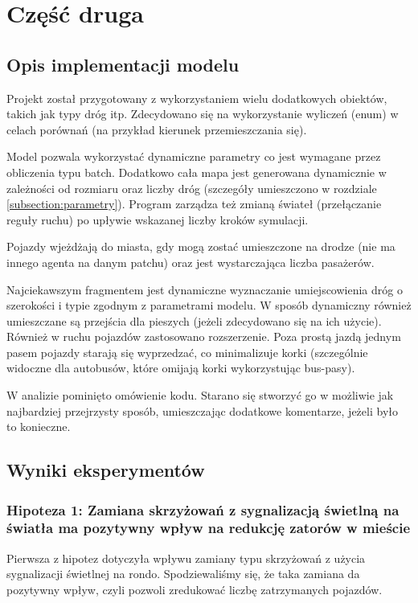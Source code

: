 \documentclass{article}
\begin{document}
\section{Część druga}
\subsection{Opis implementacji modelu}
Projekt został przygotowany z wykorzystaniem wielu dodatkowych obiektów, takich jak typy dróg itp. Zdecydowano się na wykorzystanie wyliczeń (enum) w celach porównań (na przykład kierunek przemieszczania się).

Model pozwala wykorzystać dynamiczne parametry co jest wymagane przez obliczenia typu batch. Dodatkowo cała mapa jest generowana dynamicznie w zależności od rozmiaru oraz liczby dróg (szczegóły umieszczono w rozdziale \ref{subsection:parametry}). Program zarządza też zmianą świateł (przełączanie reguły ruchu) po upływie wskazanej liczby kroków symulacji.

Pojazdy wjeżdżają do miasta, gdy mogą zostać umieszczone na drodze (nie ma innego agenta na danym patchu) oraz jest wystarczająca liczba pasażerów.

Najciekawszym fragmentem jest dynamiczne wyznaczanie umiejscowienia dróg o szerokości i typie zgodnym z parametrami modelu. W sposób dynamiczny również umieszczane są przejścia dla pieszych (jeżeli zdecydowano się na ich użycie). Również w ruchu pojazdów zastosowano rozszerzenie. Poza prostą jazdą jednym pasem pojazdy starają się wyprzedzać, co minimalizuje korki (szczególnie widoczne dla autobusów, które omijają korki wykorzystując bus-pasy).

W analizie pominięto omówienie kodu. Starano się stworzyć go w możliwie jak najbardziej przejrzysty sposób, umieszczając dodatkowe komentarze, jeżeli było to konieczne.

\subsection{Wyniki eksperymentów}
\label{subsection:wyniki-eksperymentow}

\subsubsection{Hipoteza 1: Zamiana skrzyżowań z sygnalizacją świetlną na światła ma pozytywny wpływ na redukcję zatorów w mieście}
Pierwsza z hipotez dotyczyła wpływu zamiany typu skrzyżowań z użycia sygnalizacji świetlnej na rondo. Spodziewaliśmy się, że taka zamiana da pozytywny wpływ, czyli pozwoli zredukować liczbę zatrzymanych pojazdów.
\end{document}
